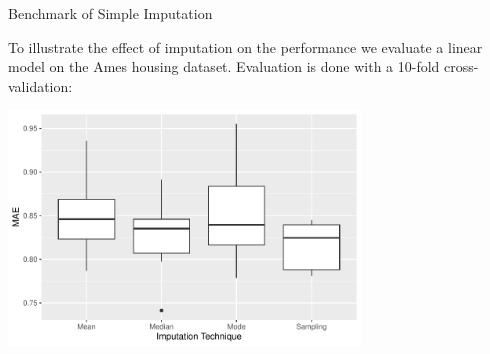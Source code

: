 \documentclass[11pt,compress,t,notes=noshow, xcolor=table]{beamer}
\begin{document}
\begin{frame}{Benchmark of Simple Imputation}

    To illustrate the effect of imputation on the performance we evaluate a linear model on the Ames housing dataset.
    Evaluation is done with a 10-fold cross-validation:
    
    \begin{center}
        \includegraphics[width=0.7\textwidth]{figure/imputation_benchmark_comparison}
    \end{center}

\end{frame}

\endlecture
\end{document}

